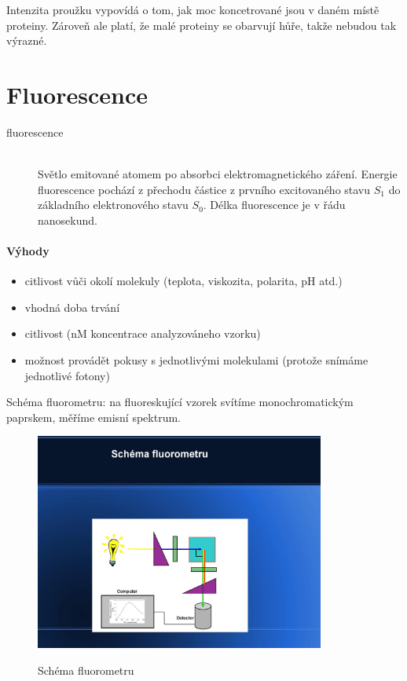 \documentclass[DIV=8]{scrreprt}
\begin{document}
Intenzita proužku vypovídá o tom, jak moc koncetrované jsou v daném místě proteiny. Zároveň ale platí, že malé proteiny se obarvují hůře, takže nebudou tak výrazné.

\section{Fluorescence} \label{Fluorescence}


\begin{description}
\item[fluorescence]\hfill \\
Světlo emitované atomem po absorbci elektromagnetického záření. Energie fluorescence pochází z přechodu částice z prvního excitovaného stavu \(S_1\) do základního elektronového stavu \(S_0\). Délka fluorescence je v řádu nanosekund.

\end{description}


\paragraph{Výhody}
\begin{itemize}[nosep]
    \item citlivost vůči okolí molekuly (teplota, viskozita, polarita, pH atd.)
    \item vhodná doba trvání
    \item citlivost (nM koncentrace analyzováneho vzorku)
    \item možnost provádět pokusy s jednotlivými molekulami (protože snímáme jednotlivé fotony)
\end{itemize}



Schéma fluorometru: na fluoreskující vzorek svítíme monochromatickým paprskem, měříme emisní spektrum.

\begin{figure}
    \caption{Schéma fluorometru}
    \includegraphics[width=0.85\textwidth]{slides-2/slide-61.jpg}
    \centering
    \label{}
\end{figure}
\end{document}
